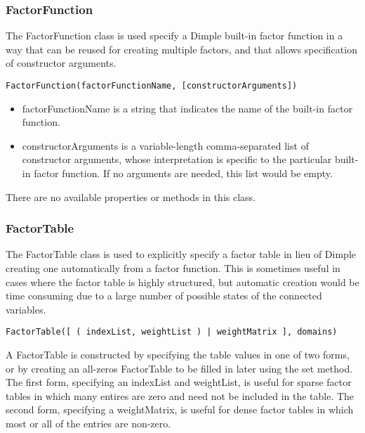 \subsubsection{FactorFunction}
\label{sec:FactorFunction}

The FactorFunction class is used specify a Dimple built-in factor function in a way that can be reused for creating multiple factors, and that allows specification of constructor arguments.


\begin{lstlisting}
FactorFunction(factorFunctionName, [constructorArguments])
\end{lstlisting}

\begin{itemize}
\item factorFunctionName is a string that indicates the name of the built-in factor function.
\item constructorArguments is a variable-length comma-separated list of constructor arguments, whose interpretation is specific to the particular built-in factor function.  If no arguments are needed, this list would be empty.
\end{itemize}

There are no available properties or methods in this class.



\subsubsection{FactorTable}
\label{sec:FactorTable}

The FactorTable class is used to explicitly specify a factor table in lieu of Dimple creating one automatically from a factor function.  This is sometimes useful in cases where the factor table is highly structured, but automatic creation would be time consuming due to a large number of possible states of the connected variables.


\begin{lstlisting}
FactorTable([ ( indexList, weightList ) | weightMatrix ], domains)
\end{lstlisting}

A FactorTable is constructed by specifying the table values in one of two forms, or by creating an all-zeros FactorTable to be filled in later using the set method.  The first form, specifying an indexList and weightList, is useful for sparse factor tables in which many entires are zero and need not be included in the table.  The second form, specifying a weightMatrix, is useful for dense factor tables in which most or all of the entries are non-zero.

